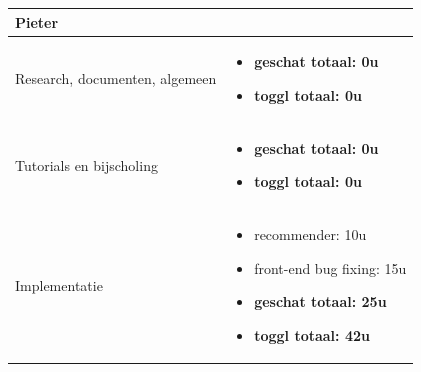 \documentclass{article}
\begin{document}

\begin{center}
\begin{tabularx}{\textwidth}[t]{XX}
\arrayrulecolor{green}\hline

\arrayrulecolor{green}\hline
\vspace{.1 mm}
\textbf{\textcolor{myGreen}{\large{Pieter}}} \vspace{.1 mm} & \\
\hline
\vspace{1 mm}
Research, documenten, algemeen & 
\begin{minipage}[t]{\linewidth}%
\vspace{1 mm}
\begin{itemize}
\item \textbf{geschat totaal: 0u}
\item \textbf{toggl totaal: 0u}
\end{itemize} 
\vspace{1 mm}
\end{minipage}\\

\arrayrulecolor{black}\hline

\vspace{1 mm}
Tutorials en bijscholing & 
\begin{minipage}[t]{\linewidth}%
\vspace{1 mm}
\begin{itemize}
\item \textbf{geschat totaal: 0u}
\item \textbf{toggl totaal: 0u}
\end{itemize} 
\vspace{1 mm}
\end{minipage}\\

\arrayrulecolor{black}\hline


\vspace{1 mm}
Implementatie & 
\begin{minipage}[t]{\linewidth}%
\vspace{1 mm}
\begin{itemize}
\item recommender: 10u
\item front-end bug fixing: 15u
\item \textbf{geschat totaal: 25u}
\item \textbf{toggl totaal: 42u}
\end{itemize} 
\vspace{1 mm}
\end{minipage}\\



\end{tabularx}
\end{center}
\end{document}
